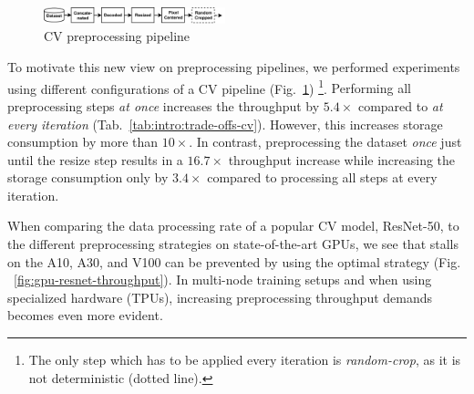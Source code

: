 \begin{figure}[h]
    \centering
    \includegraphics[width=0.47\textwidth]{figures/imagenet-pipeline/pipeline.pdf}
    \vspace*{-0.2cm}
    \caption{CV preprocessing pipeline}
    \label{fig:cv-pipeline}
\end{figure}
\vspace{-0.3cm}

To motivate this new view on preprocessing pipelines, we performed experiments using different configurations of a CV pipeline (Fig.~\ref{fig:cv-pipeline}){\color{diff} \footnote{The only step which has to be applied every iteration is \textit{random-crop}, as it is not deterministic (dotted line).}}.
{\color{diff} Performing all preprocessing steps \textit{at once} increases the throughput by $5.4\times$ compared to \textit{at every iteration} (Tab.~\ref{tab:intro:trade-offs-cv}).
However, this increases storage consumption by more than $10\times$.
In contrast, preprocessing the dataset \textit{once} just until the resize step results in a $16.7\times$ throughput increase while increasing the storage consumption only by $3.4\times$ compared to processing all steps at every iteration.}

\begin{table}[h]
\caption{Trade-offs for the CV pipeline at different preprocessing strategies.}
\label{tab:intro:trade-offs-cv}
\end{table}
\vspace{-0.5cm}

When comparing the data processing rate of a popular CV model, ResNet-50, to the different preprocessing strategies on state-of-the-art GPUs, we see that stalls on the A10, A30, and V100 can be prevented by using the optimal strategy (Fig. ~\ref{fig:gpu-resnet-throughput}).
In multi-node training setups and when using specialized hardware (TPUs), increasing preprocessing throughput demands becomes even more evident.

